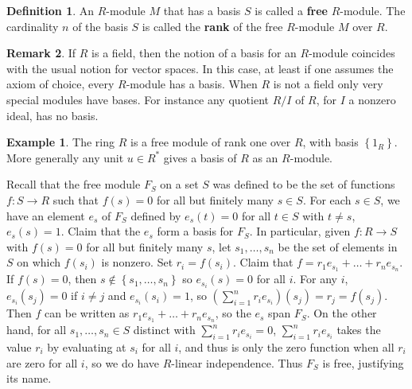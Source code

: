 \documentclass{article}
\newcommand{\rb}[1]{\left( #1 \right)}
\newcommand{\cb}[1]{\left\{ #1 \right\}}
\theoremstyle{definition}\newtheorem{definition}{Definition}[subsection]
\theoremstyle{definition}\newtheorem{remark}[definition]{Remark}
\theoremstyle{definition}\newtheorem*{example}{Example}
\theoremstyle{definition}\newtheorem*{note}{Note}
\begin{document}
\begin{definition}
An $ R $-module $ M $ that has a basis $ S $ is called a \textbf{free} $ R $-module. The cardinality $ n $ of the basis $ S $ is called the \textbf{rank} of the free $ R $-module $ M $ over $ R $.
\end{definition}


\begin{remark}
If $ R $ is a field, then the notion of a basis for an $ R $-module coincides with the usual notion for vector spaces. In this case, at least if one assumes the axiom of choice, every $ R $-module has a basis. When $ R $ is not a field only very special modules have bases. For instance any quotient $ R / I $ of $ R $, for $ I $ a nonzero ideal, has no basis.
\end{remark}

\begin{example}
The ring $ R $ is a free module of rank one over $ R $, with basis $ \cb{1_R} $. More generally any unit $ u \in R^* $ gives a basis of $ R $ as an $ R $-module.
\end{example}

Recall that the free module $ F_S $ on a set $ S $ was defined to be the set of functions $ f : S \to R $ such that $ f\rb{s} = 0 $ for all but finitely many $ s \in S $. For each $ s \in S $, we have an element $ e_s $ of $ F_S $ defined by $ e_s\rb{t} = 0 $ for all $ t \in S $ with $ t \ne s $, $ e_s\rb{s} = 1 $. Claim that the $ e_s $ form a basis for $ F_S $. In particular, given $ f : R \to S $ with $ f\rb{s} = 0 $ for all but finitely many $ s $, let $ s_1, \dots, s_n $ be the set of elements in $ S $ on which $ f\rb{s_i} $ is nonzero. Set $ r_i = f\rb{s_i} $. Claim that $ f = r_1e_{s_1} + \dots + r_ne_{s_n} $. If $ f\rb{s} = 0 $, then $ s \notin \cb{s_1, \dots, s_n} $ so $ e_{s_i}\rb{s} = 0 $ for all $ i $. For any $ i $, $ e_{s_i}\rb{s_j} = 0 $ if $ i \ne j $ and $ e_{s_i}\rb{s_i} = 1 $, so $ \rb{\sum_{i = 1}^n r_ie_{s_i}}\rb{s_j} = r_j = f\rb{s_j} $. Then $ f $ can be written as $ r_1e_{s_1} + \dots + r_ne_{s_n} $, so the $ e_s $ span $ F_S $. On the other hand, for all $ s_1, \dots, s_n \in S $ distinct with $ \sum_{i = 1}^n r_ie_{s_i} = 0 $, $ \sum_{i = 1}^n r_ie_{s_i} $ takes the value $ r_i $ by evaluating at $ s_i $ for all $ i $, and thus is only the zero function when all $ r_i $ are zero for all $ i $, so we do have $ R $-linear independence. Thus $ F_S $ is free, justifying its name.
\end{document}
